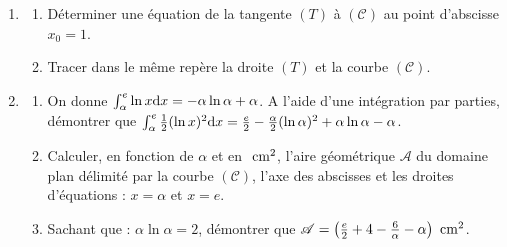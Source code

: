 \begin{enumerate}
\begin{enumerate}
                              On prend $\alpha = 2,5$ et $f(\alpha) = 1,12$.
                  \end{enumerate}
            \item \begin{enumerate}
                        \item D\'eterminer une \'equation de la tangente $(T)$ \`a $(\mathscr{C})$ au point d'abscisse $x_0 = 1$.
                        \item Tracer dans le m\^eme rep\`ere la droite $(T)$ et la courbe $(\mathscr{C})$.
                  \end{enumerate}
            \item \begin{enumerate}
                        \item On donne $\int_{\alpha}^{e} \ln x \mathrm{d}x = -\alpha \ln \alpha + \alpha$.
                              A l'aide d'une int\'egration par parties, d\'emontrer que 
                              $\int_{\alpha}^{e} \frac{1}{2} (\ln x)^2 \mathrm{d}x = \frac{e}{2} - \frac{\alpha}{2} (\ln \alpha)^2 
                              + \alpha \ln \alpha - \alpha$.
                        \item Calculer, en fonction de $\alpha$ et en $~\mathrm{cm}^2$, l'aire g\'eom\'etrique $\mathscr{A}$ 
                              du domaine plan d\'elimit\'e par la courbe $(\mathscr{C})$, l'axe des abscisses et les droites
                              d'\'equations : $x = \alpha$ et $x = e$.
                        \item Sachant que : $\alpha \ln \alpha = 2$,
                              d\'emontrer que 
                              $\mathscr{A} = \left( \frac{e}{2} + 4 - \frac{6}{\alpha} - \alpha \right) ~\mathrm{cm}^2$.
                  \end{enumerate}
      \end{enumerate}







